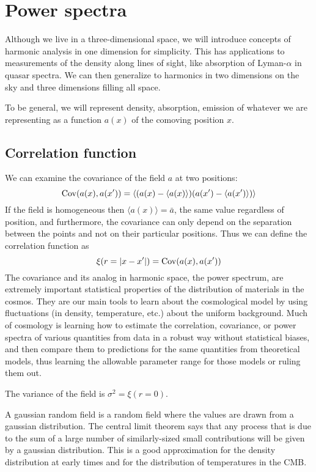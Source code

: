 \chapter{Power spectra}

Although we live in a three-dimensional space, we will introduce concepts of harmonic analysis in one dimension for simplicity.  This has applications to measurements of the density along lines of sight, like absorption of Lyman-$\alpha$ in quasar spectra.  We can then generalize to harmonics in two dimensions on the sky and three dimensions filling all space.

To be general, we will represent density, absorption, emission of whatever we are representing as a function $a(x)$ of the comoving position $x$.

\section{Correlation function}
We can examine the covariance of the field $a$ at two positions:
\begin{equation}
  {\rm Cov}(a(x),a(x')) = \left\langle (a(x) - \langle a(x) \rangle) (a(x') - \langle a(x') \rangle ) \right\rangle
\end{equation}
If the field is homogeneous then $\langle a(x) \rangle = \bar a$, the same value regardless of position, and furthermore, the covariance can only depend on the separation between the points and not on their particular positions.  Thus we can define the correlation function as
\begin{equation}
  \xi ( r = |x - x'| ) = {\rm Cov}(a(x),a(x'))
\end{equation}
The covariance and its analog in harmonic space, the power spectrum, are extremely important statistical properties of the distribution of materials in the cosmos.  They are our main tools to learn about the cosmological model by using fluctuations (in density, temperature, etc.) about the uniform background.  Much of cosmology is learning how to estimate the correlation, covariance, or power spectra of various quantities from data in a robust way without statistical biases, and then compare them to predictions for the same quantities from theoretical models, thus learning the allowable parameter range for those models or ruling them out.

The variance of the field is $\sigma^2 = \xi(r=0)$.

A gaussian random field is a random field where the values are drawn from a gaussian distribution.  The central limit theorem says that any process that is due to the sum of a large number of similarly-sized small contributions will be given by a gaussian distribution.  This is a good approximation for the density distribution at early times and for the distribution of temperatures in the CMB.

